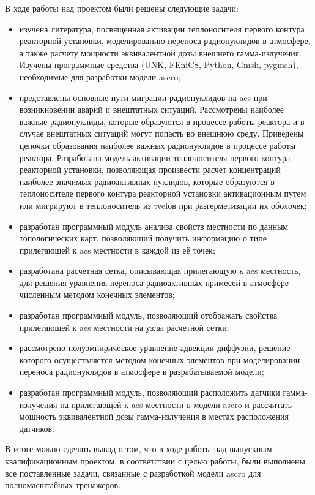 В ходе работы над проектом были решены следующие задачи:
\begin{itemize}
	\item изучена литература, посвященная активации теплоносителя первого контура реакторной установки, моделированию 
	переноса радионуклидов в атмосфере, а также расчету мощности эквивалентной дозы внешнего гамма-излучения. Изучены 
	программные средства (UNK, FEniCS, Python, Gmsh, pygmsh), необходимые для разработки модели \ac{ascro};
	\item представлены основные пути миграции радионуклидов на \ac{aes} при возникновении аварий и внештатных ситуаций. 
	Рассмотрены наиболее важные радионуклиды, которые образуются в процессе работы реактора и в случае внештатных 
	ситуаций могут попасть во внешнюю среду. Приведены цепочки образования наиболее важных радионуклидов в процессе 
	работы реактора. Разработана модель активации теплоносителя первого контура реакторной установки, позволяющая 
	произвести расчет концентраций наиболее значимых радиоактивных нуклидов, которые образуются в теплоносителе первого 
	контура реакторной установки активационным путем или мигрируют в теплоноситель из \ac{tvel}ов при разгерметизации 
	их оболочек;
	\item разработан программный модуль анализа свойств местности по данным топологических карт, позволяющий получить 
	информацию о типе прилегающей к \ac{aes} местности в каждой из её точек;
	\item разработана расчетная сетка, описывающая прилегающую к \ac{aes} местность, для решения уравнения переноса 
	радиоактивных примесей в атмосфере численным методом конечных элементов;
	\item разработан программный модуль, позволяющий отображать свойства прилегающей к \ac{aes} местности на узлы 
	расчетной сетки;
	\item рассмотрено полуэмпирическое уравнение адвекции-диффузии, решение которого осуществляется методом конечных 
	элементов при моделировании переноса радионуклидов в атмосфере в разрабатываемой модели;
	\item разработан программный модуль, позволяющий расположить датчики гамма-излучения на прилегающей к \ac{aes} 
	местности в модели \ac{ascro} и рассчитать мощность эквивалентной дозы гамма-излучения в местах расположения 
	датчиков.
\end{itemize}

В итоге можно сделать вывод о том, что в ходе работы над выпускным квалификационным проектом, в соответствии с целью 
работы, были выполнены все поставленные задачи, связанные с разработкой модели \ac{ascro} для полномасштабных тренажеров.